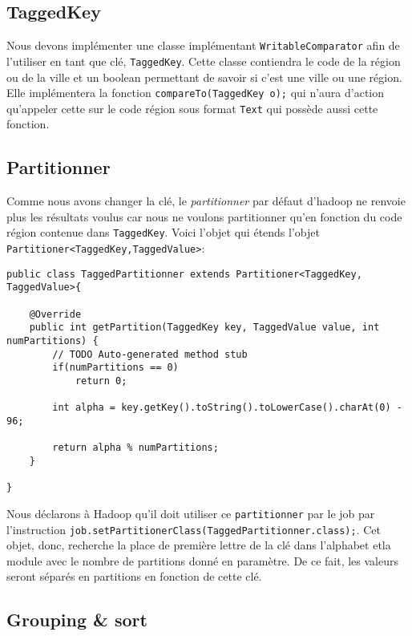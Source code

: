 \documentclass[a4paper]{article}
\begin{document}
\subsection{TaggedKey}
Nous devons implémenter une classe implémentant \verb?WritableComparator? afin de l'utiliser en tant que clé, \verb?TaggedKey?. Cette classe contiendra le code de la région ou de la ville et un boolean permettant de savoir si c'est une ville ou une région. Elle implémentera la fonction \verb?compareTo(TaggedKey o);? qui n'aura d'action qu'appeler cette sur le code région sous format \verb?Text? qui possède aussi cette fonction.

\subsection{Partitionner}
Comme nous avons changer la clé, le \textit{partitionner} par défaut d'hadoop ne renvoie plus les résultats voulus car nous ne voulons partitionner qu'en fonction du code région contenue dans \verb?TaggedKey?. Voici l'objet qui étends l'objet \verb?Partitioner<TaggedKey,TaggedValue>?:

\begin{lstlisting}
public class TaggedPartitionner extends Partitioner<TaggedKey, TaggedValue>{

	@Override
	public int getPartition(TaggedKey key, TaggedValue value, int numPartitions) {
		// TODO Auto-generated method stub
		if(numPartitions == 0)
			return 0;
		
		int alpha = key.getKey().toString().toLowerCase().charAt(0) - 96;
		
		return alpha % numPartitions;
	}

}
\end{lstlisting}

Nous déclarons à Hadoop qu'il doit utiliser ce \verb?partitionner? par le job par l'instruction \verb?job.setPartitionerClass(TaggedPartitionner.class);?. Cet objet, donc, recherche la place de première lettre de la clé dans l'alphabet etla module avec le nombre de partitions donné en paramètre. De ce fait, les valeurs seront séparés en partitions en fonction de cette clé.

\subsection{Grouping & sort}
\end{document}
